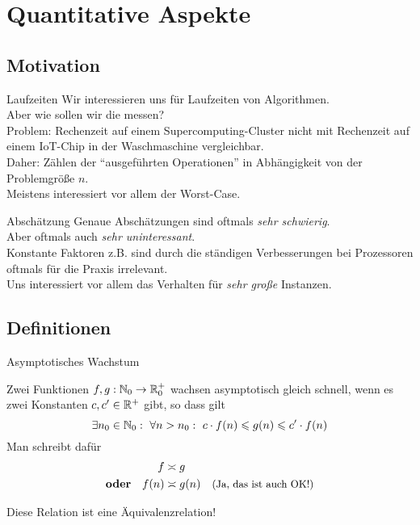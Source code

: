 \section{Quantitative Aspekte}


\subsection{Motivation}
\begin{frame}{Laufzeiten}
	Wir interessieren uns für Laufzeiten von Algorithmen.\\
	Aber wie sollen wir die messen?\\ \pause
	Problem: Rechenzeit auf einem Supercomputing-Cluster nicht mit Rechenzeit auf einem IoT-Chip in der Waschmaschine vergleichbar.\\
	
	\bigskip \pause
	Daher: Zählen der \enquote{ausgeführten Operationen} in Abhängigkeit von der Problemgröße $n$.\\
	Meistens interessiert vor allem der Worst-Case.
\end{frame}

\begin{frame}{Abschätzung}
	Genaue Abschätzungen sind oftmals \textit{sehr schwierig}.\\
	Aber oftmals auch \textit{sehr uninteressant}.\\
	Konstante Faktoren z.B. sind durch die ständigen Verbesserungen bei Prozessoren oftmals für die Praxis irrelevant.\\
	
	\bigskip \pause
	Uns interessiert vor allem das Verhalten für \textit{sehr große} Instanzen.
\end{frame}


\subsection{Definitionen}
\begin{frame}{Asymptotisches Wachstum}
	\begin{Definition}
		Zwei Funktionen $f,g: \mathbb{N}_0 \to \mathbb{R}_0^+$ wachsen asymptotisch gleich schnell, wenn es zwei Konstanten $c, c' \in \mathbb{R}^+$ gibt, so dass gilt $$\exists n_0 \in \mathbb{N}_0: \ \forall n > n_0: \ c \cdot f(n) \leqslant g(n) \leqslant c' \cdot f(n) $$
		Man schreibt dafür 
		\begin{align*}
			f &\asymp g \\
			\textbf{oder} \quad f(n) &\asymp g(n) \quad \text{{\small (Ja, das ist auch OK!)}}  
		\end{align*}
	\end{Definition} \pause
	Diese Relation ist eine Äquivalenzrelation!
\end{frame}

